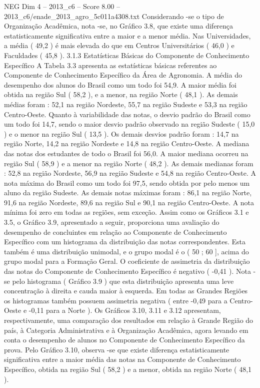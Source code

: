 \begin{textsample}{NEG Dim 4 – 2013\_c6 – Score 8.00 – 2013\_c6/enade\_2013\_agro\_5c011a4308.txt}
Considerando -se o tipo de Organização Acadêmica, nota -se, no Gráfico 3.8, que existe uma diferença estatisticamente significativa entre a maior e a menor média.
Nas Universidades, a média ( 49,2 ) é mais elevada do que em Centros Universitários ( 46,0 ) e Faculdades ( 45,8 ). 3.1.3 Estatísticas Básicas do Componente de Conhecimento Específico A Tabela 3.3 apresenta as estatísticas básicas referentes ao Componente de Conhecimento Específico da Área de Agronomia.
A média do desempenho dos alunos do Brasil como um todo foi 54,9.
A maior média foi obtida na região Sul ( 58,2 ), e a menor, na região Norte ( 48,1 ).
As demais médias foram : 52,1 na região Nordeste, 55,7 na região Sudeste e 53,3 na região Centro-Oeste.
Quanto à variabilidade das notas, o desvio padrão do Brasil como um todo foi 14,7, sendo o maior desvio padrão observado na região Sudeste ( 15,0 ) e o menor na região Sul ( 13,5 ).
Os demais desvios padrão foram : 14,7 na região Norte, 14,2 na região Nordeste e 14,8 na região Centro-Oeste.
A mediana das notas dos estudantes de todo o Brasil foi 56,0.
A maior mediana ocorreu na região Sul ( 58,9 ) e a menor na região Norte ( 48,2 ).
As demais medianas foram : 52,8 na região Nordeste, 56,9 na região Sudeste e 54,8 na região Centro-Oeste.
A nota máxima do Brasil como um todo foi 97,5, sendo obtida por pelo menos um aluno da região Sudeste.
As demais notas máximas foram : 86,1 na região Norte, 91,6 na região Nordeste, 89,6 na região Sul e 90,1 na região Centro-Oeste.
A nota mínima foi zero em todas as regiões, sem exceção.
Assim como os Gráficos 3.1 e 3.5, o Gráfico 3.9, apresentado a seguir, proporciona uma avaliação do desempenho de concluintes em relação ao Componente de Conhecimento Específico com um histograma da distribuição das notas correspondentes.
Esta também é uma distribuição unimodal, e o grupo modal é o ( 50 ; 60 ], acima do grupo modal para a Formação Geral.
O coeficiente de assimetria da distribuição das notas do Componente de Conhecimento Específico é negativo ( -0,41 ).
Nota -se pelo histograma ( Gráfico 3.9 ) que esta distribuição apresenta uma leve concentração à direita e cauda maior à esquerda.
Em todas as Grandes Regiões os histogramas também possuem assimetria negativa ( entre -0,49 para a Centro-Oeste e -0,11 para a Norte ).
Os Gráficos 3.10, 3.11 e 3.12 apresentam, respectivamente, uma comparação dos resultados em relação à Grande Região do país, à Categoria Administrativa e à Organização Acadêmica, agora levando em conta o desempenho de alunos no Componente de Conhecimento Específico da prova.
Pelo Gráfico 3.10, observa -se que existe diferença estatisticamente significativa entre a maior média das notas na Componente de Conhecimento Específico, obtida na região Sul ( 58,2 ) e a menor, obtida na região Norte ( 48,1 ).

\end{textsample}
